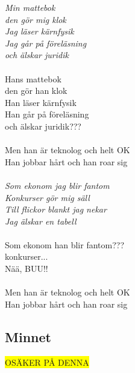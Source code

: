 \newpage


\noindent\textit{Min mattebok \\
den gör mig klok\\
Jag läser kärnfysik\\
Jag går på föreläsning\\
och älskar juridik}\\\\
\noindent Hans mattebok\\
den gör han klok\\
Han läser kärnfysik\\
Han går på föreläsning\\
och älskar juridik???\\\\
\noindent Men han är teknolog och helt OK\\
Han jobbar hårt och han roar sig\\\\
\noindent\textit{Som ekonom jag blir fantom\\
Konkurser gör mig säll\\
Till flickor blankt jag nekar\\
Jag älskar en tabell}\\\\
\noindent Som ekonom han blir fantom???\\
konkurser...\\
Nää, BUU!!\\\\
\noindent Men han är teknolog och helt OK\\
Han jobbar hårt och han roar sig\\


\newpage

\subsection*{Minnet} 

\colorbox{yellow}{OSÄKER PÅ DENNA}




\newpage

